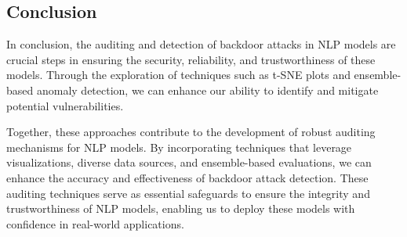 \subsection{Conclusion}

In conclusion, the auditing and detection of backdoor attacks in NLP models are crucial steps in ensuring the security, reliability, and trustworthiness of these models. Through the exploration of techniques such as t-SNE plots and ensemble-based anomaly detection, we can enhance our ability to identify and mitigate potential vulnerabilities.

Together, these approaches contribute to the development of robust auditing mechanisms for NLP models. By incorporating techniques that leverage visualizations, diverse data sources, and ensemble-based evaluations, we can enhance the accuracy and effectiveness of backdoor attack detection. These auditing techniques serve as essential safeguards to ensure the integrity and trustworthiness of NLP models, enabling us to deploy these models with confidence in real-world applications.